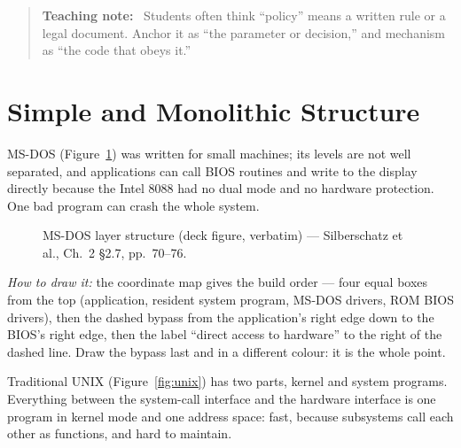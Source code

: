\documentclass[11pt]{article}
\newenvironment{teachingaside}{\begin{quote}\small\color{primary-gold}\textbf{Teaching note:}\ }{\end{quote}}
\begin{document}
\begin{teachingaside}
Students often think ``policy'' means a written rule or a legal document. Anchor it as ``the parameter or decision,'' and mechanism as ``the code that obeys it.''
\end{teachingaside}

\section{Simple and Monolithic Structure}

MS-DOS (Figure~\ref{fig:msdos}) was written for small machines; its levels are not well separated, and applications can call BIOS routines and write to the display directly because the Intel 8088 had no dual mode and no hardware protection. One bad program can crash the whole system.

\begin{figure}[h]
\centering
{}
\caption{MS-DOS layer structure (deck figure, verbatim) --- Silberschatz et al., Ch.~2 \S2.7, pp.~70--76.}
\label{fig:msdos}
\end{figure}

\emph{How to draw it:} the coordinate map gives the build order --- four equal boxes from the top (application, resident system program, MS-DOS drivers, ROM BIOS drivers), then the dashed bypass from the application's right edge down to the BIOS's right edge, then the label ``direct access to hardware'' to the right of the dashed line. Draw the bypass last and in a different colour: it is the whole point.

Traditional UNIX (Figure~\ref{fig:unix}) has two parts, kernel and system programs. Everything between the system-call interface and the hardware interface is one program in kernel mode and one address space: fast, because subsystems call each other as functions, and hard to maintain.
\end{document}
